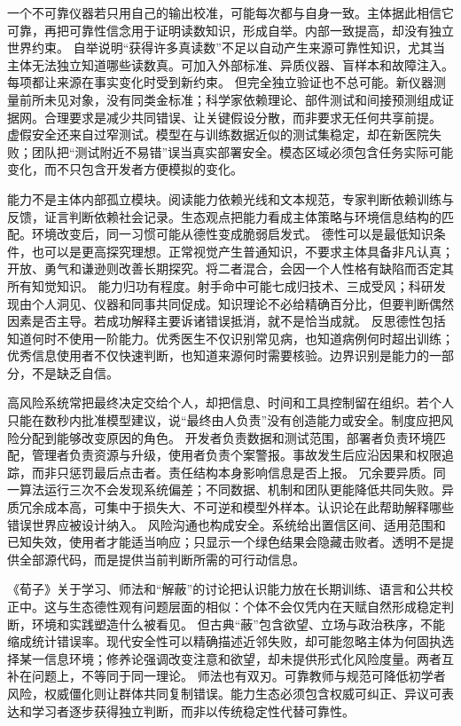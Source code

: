 一个不可靠仪器若只用自己的输出校准，可能每次都与自身一致。主体据此相信它可靠，再把可靠性信念用于证明读数知识，形成自举。内部一致提高，却没有独立世界约束。 自举说明“获得许多真读数”不足以自动产生来源可靠性知识，尤其当主体无法独立知道哪些读数真。可加入外部标准、异质仪器、盲样本和故障注入。每项都让来源在事实变化时受到新约束。 但完全独立验证也不总可能。新仪器测量前所未见对象，没有同类金标准；科学家依赖理论、部件测试和间接预测组成证据网。合理要求是减少共同错误、让关键假设分散，而非要求无任何共享前提。 虚假安全还来自过窄测试。模型在与训练数据近似的测试集稳定，却在新医院失败；团队把“测试附近不易错”误当真实部署安全。模态区域必须包含任务实际可能变化，而不只包含开发者方便模拟的变化。

能力不是主体内部孤立模块。阅读能力依赖光线和文本规范，专家判断依赖训练与反馈，证言判断依赖社会记录。生态观点把能力看成主体策略与环境信息结构的匹配。环境改变后，同一习惯可能从德性变成脆弱启发式。 德性可以是最低知识条件，也可以是更高探究理想。正常视觉产生普通知识，不要求主体具备非凡认真；开放、勇气和谦逊则改善长期探究。将二者混合，会因一个人性格有缺陷而否定其所有知觉知识。 能力归功有程度。射手命中可能七成归技术、三成受风；科研发现由个人洞见、仪器和同事共同促成。知识理论不必给精确百分比，但要判断偶然因素是否主导。若成功解释主要诉诸错误抵消，就不是恰当成就。 反思德性包括知道何时不使用一阶能力。优秀医生不仅识别常见病，也知道病例何时超出训练；优秀信息使用者不仅快速判断，也知道来源何时需要核验。边界识别是能力的一部分，不是缺乏自信。

高风险系统常把最终决定交给个人，却把信息、时间和工具控制留在组织。若个人只能在数秒内批准模型建议，说“最终由人负责”没有创造能力或安全。制度应把风险分配到能够改变原因的角色。 开发者负责数据和测试范围，部署者负责环境匹配，管理者负责资源与升级，使用者负责个案警报。事故发生后应沿因果和权限追踪，而非只惩罚最后点击者。责任结构本身影响信息是否上报。 冗余要异质。同一算法运行三次不会发现系统偏差；不同数据、机制和团队更能降低共同失败。异质冗余成本高，可集中于损失大、不可逆和模型外样本。认识论在此帮助解释哪些错误世界应被设计纳入。 风险沟通也构成安全。系统给出置信区间、适用范围和已知失效，使用者才能适当响应；只显示一个绿色结果会隐藏击败者。透明不是提供全部源代码，而是提供当前判断所需的可行动信息。

《荀子》关于学习、师法和“解蔽”的讨论把认识能力放在长期训练、语言和公共校正中\parencite{xunzi2014}。这与生态德性观有问题层面的相似：个体不会仅凭内在天赋自然形成稳定判断，环境和实践塑造什么被看见。 但古典“蔽”包含欲望、立场与政治秩序，不能缩成统计错误率。现代安全性可以精确描述近邻失败，却可能忽略主体为何固执选择某一信息环境；修养论强调改变注意和欲望，却未提供形式化风险度量。两者互补在问题上，不等同于同一理论。 师法也有双刃。可靠教师与规范可降低初学者风险，权威僵化则让群体共同复制错误。能力生态必须包含权威可纠正、异议可表达和学习者逐步获得独立判断，而非以传统稳定性代替可靠性。

